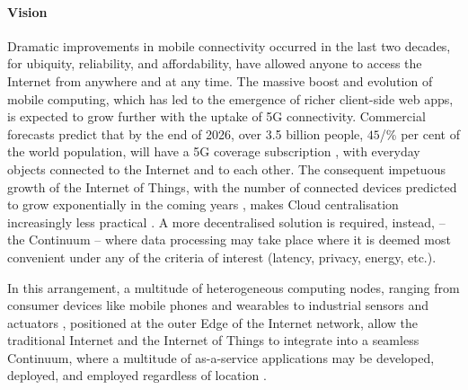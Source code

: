 \paragraph{Vision}
Dramatic improvements in mobile connectivity occurred in the last two decades, for ubiquity, reliability, and affordability, have allowed anyone to access the Internet from anywhere and at any time.
The massive boost and evolution of mobile computing, which has led to the emergence of richer client-side web apps, is expected to grow further with the uptake of 5G connectivity. 
Commercial forecasts predict that by the end of 2026,  over 3.5 billion people, $45$/\% per cent of the world population, will have a 5G coverage subscription \cite{ericsson-5g}, with everyday objects connected to the Internet and to each other. 
The consequent impetuous growth of the Internet of Things, with the number of connected devices predicted to grow exponentially in the coming years \cite{gartner-iot}, makes Cloud centralisation increasingly less practical \cite{mell2011nist}.
A more decentralised solution is required, instead, -- the Continuum -- where data processing may take place where it is deemed most convenient under any of the criteria of interest (latency, privacy, energy, etc.).

In this arrangement, a multitude of heterogeneous computing nodes, ranging from consumer devices like mobile phones and wearables to industrial sensors and actuators \cite{chen2018edge}, positioned at the outer Edge of the Internet network, allow the traditional Internet and the Internet of Things to integrate into a seamless Continuum, where a multitude of as-a-service applications may be developed, deployed, and employed regardless of location \cite{beckman2020harnessing}.

